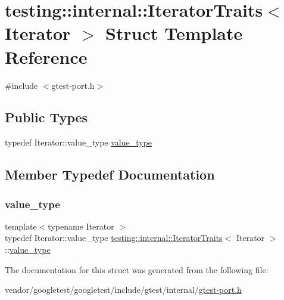 \hypertarget{structtesting_1_1internal_1_1_iterator_traits}{}\section{testing\+:\+:internal\+:\+:Iterator\+Traits$<$ Iterator $>$ Struct Template Reference}
\label{structtesting_1_1internal_1_1_iterator_traits}


{\ttfamily \#include $<$gtest-\/port.\+h$>$}

\subsection*{Public Types}
\begin{DoxyCompactItemize}
\item 
typedef Iterator\+::value\+\_\+type \hyperlink{structtesting_1_1internal_1_1_iterator_traits_a29de4320a9c53ce438d3561b94e515bb}{value\+\_\+type}
\end{DoxyCompactItemize}


\subsection{Member Typedef Documentation}
\mbox{\label{structtesting_1_1internal_1_1_iterator_traits_a29de4320a9c53ce438d3561b94e515bb}} 
\subsubsection{\texorpdfstring{value\+\_\+type}{value\_type}}
{\footnotesize\ttfamily template$<$typename Iterator $>$ \\
typedef Iterator\+::value\+\_\+type \hyperlink{structtesting_1_1internal_1_1_iterator_traits}{testing\+::internal\+::\+Iterator\+Traits}$<$ Iterator $>$\+::\hyperlink{structtesting_1_1internal_1_1_iterator_traits_a29de4320a9c53ce438d3561b94e515bb}{value\+\_\+type}}



The documentation for this struct was generated from the following file\+:\begin{DoxyCompactItemize}
\item 
vendor/googletest/googletest/include/gtest/internal/\hyperlink{gtest-port_8h}{gtest-\/port.\+h}\end{DoxyCompactItemize}
